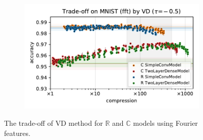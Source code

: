\documentclass[a4paper,10pt,twocolumn]{article}
\newcommand{\real}{\mathbb{R}}
\newcommand{\cplx}{\mathbb{C}}
\begin{document}
\begin{figure}[b]
\begin{subfigure}[b]{0.5\columnwidth}
  \end{subfigure}%
  \begin{subfigure}[b]{0.5\columnwidth}
    \centering
    \includegraphics[width=\linewidth]{figure__mnist-like__trade-off/appendix__VD__mnist__fft__-0.5.pdf}
  \end{subfigure}
  \caption{%
    The trade-off of VD method for $\real$ and $\cplx$ models using Fourier features.
  }
  \label{fig:appendix__mnist-like__trade-off__VD__fft}
\end{figure}
\end{document}
